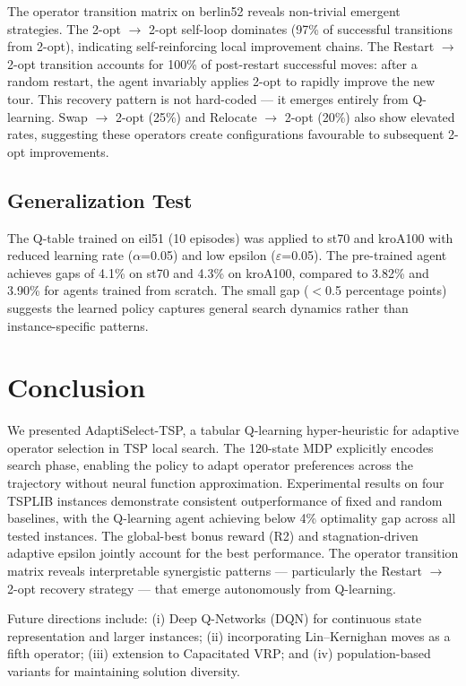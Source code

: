 \documentclass{article}
\begin{document}
The operator transition matrix on berlin52 reveals non-trivial emergent
strategies. The 2-opt $\rightarrow$ 2-opt self-loop dominates (97\% of
successful transitions from 2-opt), indicating self-reinforcing local
improvement chains. The Restart $\rightarrow$ 2-opt transition accounts for
100\% of post-restart successful moves: after a random restart, the agent
invariably applies 2-opt to rapidly improve the new tour. This recovery pattern
is not hard-coded --- it emerges entirely from Q-learning. Swap $\rightarrow$
2-opt (25\%) and Relocate $\rightarrow$ 2-opt (20\%) also show elevated rates,
suggesting these operators create configurations favourable to subsequent 2-opt
improvements.

\subsection{Generalization Test}

The Q-table trained on eil51 (10 episodes) was applied to st70 and kroA100 with
reduced learning rate ($\alpha$=0.05) and low epsilon ($\varepsilon$=0.05). The
pre-trained agent achieves gaps of 4.1\% on st70 and 4.3\% on kroA100, compared
to 3.82\% and 3.90\% for agents trained from scratch. The small gap
($<$0.5 percentage points) suggests the learned policy captures general search
dynamics rather than instance-specific patterns.

\section{Conclusion}

We presented AdaptiSelect-TSP, a tabular Q-learning hyper-heuristic for
adaptive operator selection in TSP local search. The 120-state MDP explicitly
encodes search phase, enabling the policy to adapt operator preferences across
the trajectory without neural function approximation. Experimental results on
four TSPLIB instances demonstrate consistent outperformance of fixed and random
baselines, with the Q-learning agent achieving below 4\% optimality gap across
all tested instances. The global-best bonus reward (R2) and stagnation-driven
adaptive epsilon jointly account for the best performance. The operator
transition matrix reveals interpretable synergistic patterns --- particularly
the Restart $\rightarrow$ 2-opt recovery strategy --- that emerge autonomously
from Q-learning.

Future directions include: (i) Deep Q-Networks (DQN) for continuous state
representation and larger instances; (ii) incorporating Lin--Kernighan moves as
a fifth operator; (iii) extension to Capacitated VRP; and (iv) population-based
variants for maintaining solution diversity.



\end{document}
